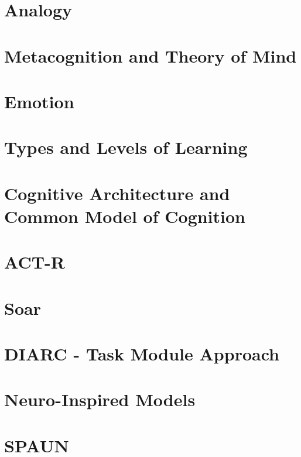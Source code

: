 \documentclass[11pt]{article}
\begin{document}
\section{Analogy}


\section{Metacognition and Theory of Mind}


\section{Emotion}


\section{Types and Levels of Learning}


\section{Cognitive Architecture and Common Model of Cognition}


\section{ACT-R}


\section{Soar}


\section{DIARC - Task Module Approach}


\section{Neuro-Inspired Models}


\section{SPAUN}

\end{document}
